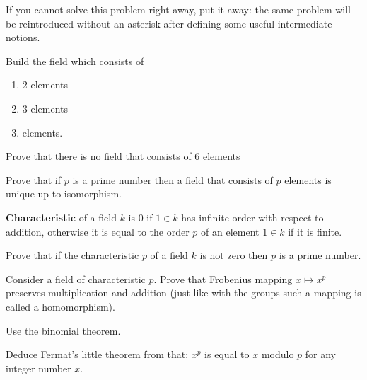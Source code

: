 \documentclass[12pt]{article}
\begin{document}
\begin{zamechanie}
If you cannot solve this problem right away, put it away: the same
problem will be reintroduced without an asterisk after defining some
useful intermediate notions.
\end{zamechanie}

\begin{zadacha}
Build the field which consists of
\begin{enumerate}
\item 2 elements
\item 3 elements
\item{} elements.
\end{enumerate}
\end{zadacha}

\begin{zadacha}[*]
Prove that there is no field that consists of 6 elements
\end{zadacha}

\begin{zadacha}
Prove that if $p$ is a prime number then a field that consists of $p$
elements is unique up to isomorphism.
\end{zadacha}

\begin{opredelenie} {\bf Characteristic} of a field $k$ is $0$ if $1
  \in k$ has infinite order with respect to addition, otherwise it is
  equal to the order $p$ of an element $1 \in k$ if it is finite.
\end{opredelenie}

\begin{zadacha}
Prove that if the characteristic $p$ of a field $k$ is not zero then
$p$ is a prime number.
\end{zadacha} 

\begin{zadacha}[*]
  Consider a field of characteristic $p$. Prove that Frobenius mapping
  $x \mapsto x^p$ preserves multiplication and addition (just like
  with the groups such a mapping is called a homomorphism).
\end{zadacha}

\begin{ukazanie} Use the binomial theorem.
\end{ukazanie}

\begin{zadacha}[*]
Deduce Fermat's little theorem from that: $x^p$ is equal to $x$
modulo $p$ for any integer number $x$.
\end{zadacha}
\end{document}
